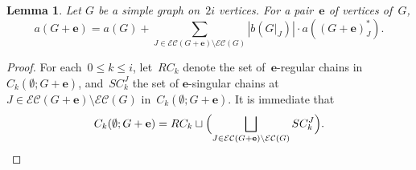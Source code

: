 \documentclass[10pt]{amsart}
\theoremstyle{plain}
\newtheorem{lemma}[theorem]{Lemma}
\numberwithin{equation}{section}
\theoremstyle{definition}
\newcommand{\edge}{\mathbf{e}}
\newcommand{\EC}{\mathcal{E}\mathcal{C}}
\begin{document}
    

\begin{lemma}\label{lemma:decom}
    Let $G$ be a simple graph on~$2i$ vertices.
    For a pair~$\edge$ of vertices of~$G$,
    $$
    a(G+\edge) = a(G) + \sum_{J \in \EC(G+\edge) \setminus \EC(G)} \left\vert b(G\vert_J) \right\vert \cdot a((G+\edge)^\ast_J).
    $$
\end{lemma}

\begin{proof}
    For each~$0 \leq k \leq i$, let~$RC_k$ denote the set of~$\edge$-regular chains in~$C_k(\emptyset;G+\edge)$, and~$SC^J_k$ the set of $\edge$-singular chains at $J \in \EC(G+\edge) \setminus \EC(G)$ in~$C_k(\emptyset;G+\edge)$.
    It is immediate that
    $$
    C_k(\emptyset;G+\edge) = RC_k \sqcup \Bigl(\bigsqcup_{J \in \EC(G+\edge) \setminus \EC(G)} SC_k^J \Bigl).
    $$
    

\end{proof}
\end{document}
